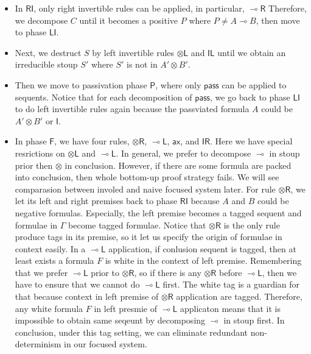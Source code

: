 \documentclass{article}
\newcommand{\tl}{\otimes \mathsf{L}}
\newcommand{\tr}{\otimes \mathsf{R}}
\newcommand{\lright}{\multimap \mathsf{R}}
\newcommand{\lleft}{\multimap \mathsf{L}}
\newcommand{\pass}{\mathsf{pass}}
\newcommand{\unitl}{\mathsf{IL}}
\newcommand{\unitr}{\mathsf{IR}}
\newcommand{\ax}{\mathsf{ax}}
\newcommand{\ot}{\otimes}
\newcommand{\lolli}{\multimap}
\newcommand{\I}{\mathsf{I}}
\newcommand{\RI}{\mathsf{RI}}
\newcommand{\LI}{\mathsf{LI}}
\newcommand{\Pass}{\mathsf{P}}
\newcommand{\F}{\mathsf{F}}
\begin{document}
\begin{itemize}
  \item In $\RI$, only right invertible rules can be applied, in particular, $\lright$
  Therefore, we decompose $C$ until it becomes a positive $P$ where $P \neq A \lolli B$, then move to phase $\LI$.
  \item Next, we destruct $S$ by left invertible rules $\tl$ and $\unitl$ until we obtain an irreducible stoup $S'$ where $S'$ is not in $A' \ot B'$.
  \item Then we move to passivation phase $\Pass$, where only $\pass$ can be applied to sequents.
  Notice that for each decomposition of $\pass$, we go back to phase $\LI$ to do left invertible rules again because the passviated formula $A$ could be $A' \ot B'$ or $\I$.
  \item In phase $\F$, we have four rules, $\tr$, $\lleft$, $\ax$, and $\unitr$.
  Here we have special resrictions on $\tl$ and $\lleft$.
  In general, we prefer to decompose $\lolli$ in stoup prior then $\ot$ in conclusion.
  However, if there are some formula are packed into conclusion, then whole bottom-up proof strategy fails.
  We will see comparasion between involed and naive focused system later.
  For rule $\tr$, we let its left and right premises back to phase $\RI$ because $A$ and $B$ could be negative formulas.
  Especially, the left premise becomes a tagged sequent and formulae in $\Gamma$ become tagged formulae.
  Notice that $\tr$ is the only rule produce tags in its premise, so it let us specify the origin of formulae in context easily.
  In a $\lleft$ application, if conlusion sequent is tagged, then at least exists a formula $F$ is white in the context of left premise.
  Remembering that we prefer $\lleft$ prior to $\tr$, so if there is any $\tr$ before $\lleft$, then we have to ensure that we cannot do $\lleft$ first.
  The white tag is a guardian for that because context in left premise of $\tr$ application are tagged.
  Therefore, any white formula $F$ in left presmie of $\lleft$ applicaton means that it is impossible to obtain same seqeunt by decomposing $\lolli$ in stoup first.
  In conclusion, under this tag setting, we can eliminate redundant non-determinism in our focused system.
\end{itemize}
\end{document}
